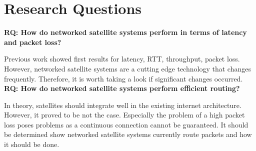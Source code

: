\section{Research Questions} \label{sec:research-questions}

\noindent \textbf{RQ: How do networked satellite systems perform in terms of latency and packet loss?}

Previous work \cite{DBLP:conf/imc/MichelTGB22, DBLP:conf/infocom/MaCZCML23, Segan2020} showed first results for latency, \ac{RTT}, throughput, packet loss. However, networked satellite systems are a cutting edge technology that changes frequently. Therefore, it is worth taking a look if significant changes occurred. \\

\noindent \textbf{RQ: How do networked satellite systems perform efficient routing?}

In theory, satellites should integrate well in the existing internet architecture. However, it proved to be not the case. Especially the problem of a high packet loss \cite{DBLP:conf/infocom/MaCZCML23} poses problems as a continuous connection cannot be guaranteed. It should be determined show networked satellite systems currently route packets and how it should be done.
